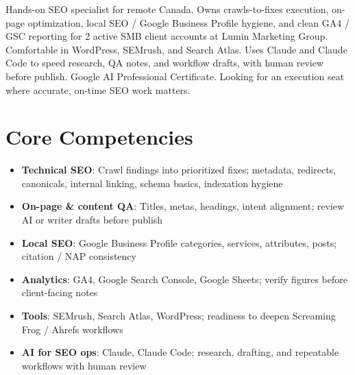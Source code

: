\documentclass[11pt,a4paper,sans]{moderncv}
\begin{document}
\makecvtitle

\vspace{6pt}
\small{Hands-on SEO specialist for remote Canada. Owns crawls-to-fixes execution, on-page optimization, local SEO / Google Business Profile hygiene, and clean GA4 / GSC reporting for 2 active SMB client accounts at Lumin Marketing Group. Comfortable in WordPress, SEMrush, and Search Atlas. Uses Claude and Claude Code to speed research, QA notes, and workflow drafts, with human review before publish. Google AI Professional Certificate. Looking for an execution seat where accurate, on-time SEO work matters.}

\section{Core Competencies}
\vspace{1pt}
\begin{itemize}
\item \textbf{Technical SEO}: Crawl findings into prioritized fixes; metadata, redirects, canonicals, internal linking, schema basics, indexation hygiene
\item \textbf{On-page \& content QA}: Titles, metas, headings, intent alignment; review AI or writer drafts before publish
\item \textbf{Local SEO}: Google Business Profile categories, services, attributes, posts; citation / NAP consistency
\item \textbf{Analytics}: GA4, Google Search Console, Google Sheets; verify figures before client-facing notes
\item \textbf{Tools}: SEMrush, Search Atlas, WordPress; readiness to deepen Screaming Frog / Ahrefs workflows
\item \textbf{AI for SEO ops}: Claude, Claude Code; research, drafting, and repeatable workflows with human review
\end{itemize}
\end{document}
